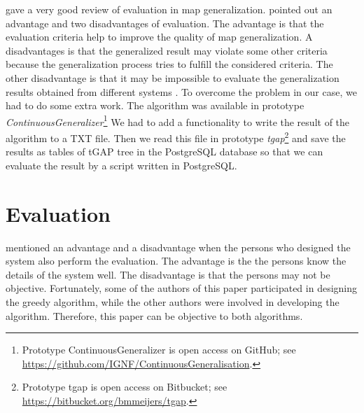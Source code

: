 \documentclass[ijgi,article,submit,moreauthors,pdftex]{Definitions/mdpi}
\begin{document}
\citet{Stoter2014Evaluation} gave a very good review 
of evaluation in map generalization.
\citet{Stoter2014Evaluation} pointed out 
an advantage and two disadvantages of evaluation.
The advantage is that 
the evaluation criteria help to improve the quality of map generalization.
A disadvantages is that 
the generalized result may violate some other criteria 
because the generalization process tries to fulfill the considered criteria.
The other disadvantage is that it may be impossible to evaluate 
the generalization results 
obtained from different systems \citep{Ruas2001Report}.
To overcome the problem in our case, 
we had to do some extra work.
The \astar algorithm was available in prototype
\emph{ContinuousGeneralizer}\footnote{Prototype ContinuousGeneralizer
    is open access on GitHub; 
	see	\url{https://github.com/IGNF/ContinuousGeneralisation}.}
We had to add a functionality 
to write the result of the \astar algorithm to a TXT file.
Then we read this file in prototype 
\emph{tgap}\footnote{Prototype tgap is open access on Bitbucket; 
	see	\url{https://bitbucket.org/bmmeijers/tgap}.}
and save the results as tables of tGAP tree in the PostgreSQL database
so that we can evaluate the result by a script written in 
PostgreSQL.






\citet{Ruas2001Report}

\citet{HaunertWolff2010AreaAgg}

\citet{Peng2017AStar}




\section{Evaluation}
\label{sec:evaluation}

\citet{Ruas2001Report} mentioned an advantage and a disadvantage
when the persons who designed the system also perform the evaluation.
The advantage is the the persons know the details of the system well.
The disadvantage is that the persons may not be objective.
Fortunately, some of the authors of this paper 
participated in designing the greedy algorithm,
while the other authors were involved in developing the \astar algorithm.
Therefore, this paper can be objective to both algorithms.
\end{document}
